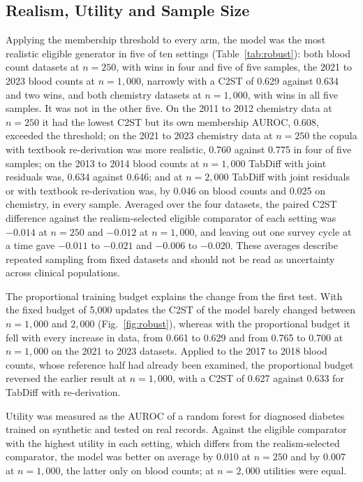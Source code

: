 \documentclass[conference]{IEEEtran}
\begin{document}
\subsection*{Realism, Utility and Sample Size}

Applying the membership threshold to every arm, the model was the most realistic eligible generator in five of ten settings (Table~\ref{tab:robust}): both blood count datasets at $n = 250$, with wins in four and five of five samples, the 2021 to 2023 blood counts at $n = 1{,}000$, narrowly with a C2ST of 0.629 against 0.634 and two wins, and both chemistry datasets at $n = 1{,}000$, with wins in all five samples. It was not in the other five. On the 2011 to 2012 chemistry data at $n = 250$ it had the lowest C2ST but its own membership AUROC, 0.608, exceeded the threshold; on the 2021 to 2023 chemistry data at $n = 250$ the copula with textbook re-derivation was more realistic, 0.760 against 0.775 in four of five samples; on the 2013 to 2014 blood counts at $n = 1{,}000$ TabDiff with joint residuals was, 0.634 against 0.646; and at $n = 2{,}000$ TabDiff with joint residuals or with textbook re-derivation was, by 0.046 on blood counts and 0.025 on chemistry, in every sample. Averaged over the four datasets, the paired C2ST difference against the realism-selected eligible comparator of each setting was $-0.014$ at $n = 250$ and $-0.012$ at $n = 1{,}000$, and leaving out one survey cycle at a time gave $-0.011$ to $-0.021$ and $-0.006$ to $-0.020$. These averages describe repeated sampling from fixed datasets and should not be read as uncertainty across clinical populations.

The proportional training budget explains the change from the first test. With the fixed budget of 5,000 updates the C2ST of the model barely changed between $n = 1{,}000$ and $2{,}000$ (Fig.~\ref{fig:robust}), whereas with the proportional budget it fell with every increase in data, from 0.661 to 0.629 and from 0.765 to 0.700 at $n = 1{,}000$ on the 2021 to 2023 datasets. Applied to the 2017 to 2018 blood counts, whose reference half had already been examined, the proportional budget reversed the earlier result at $n = 1{,}000$, with a C2ST of 0.627 against 0.633 for TabDiff with re-derivation.

Utility was measured as the AUROC of a random forest for diagnosed diabetes trained on synthetic and tested on real records. Against the eligible comparator with the highest utility in each setting, which differs from the realism-selected comparator, the model was better on average by 0.010 at $n = 250$ and by 0.007 at $n = 1{,}000$, the latter only on blood counts; at $n = 2{,}000$ utilities were equal.
\end{document}
